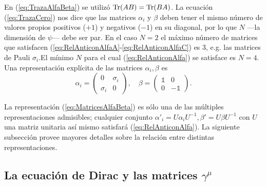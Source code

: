 En (\ref{eq:TrazaAlfaBeta}) se utilizó $\operatorname{Tr}(AB)=\operatorname{Tr}(BA)$. La ecuación (\ref{eq:TrazaCero}) nos dice que las matrices $\alpha_i$ y $\beta$ deben tener el mismo número de valores propios positivos ($+1$) y negativos ($-1$) en su diagonal, por lo que $N$ ---la dimensión de $\psi$--- debe ser par. En el caso $N=2$ el máximo número de matrices que satisfacen (\ref{eq:RelAnticonAlfaA}-\ref{eq:RelAnticonAlfaC}) es 3, e.g. las matrices de Pauli $\sigma_i$.\footnotemark El mínimo $N$ para el cual (\ref{eq:RelAnticonAlfa}) se satisface es $N=4$. Una representación explícita de las matrices $\alpha_i, \beta$ es
\begin{equation}\label{eq:MatricesAlfaBeta}
     \alpha_i=\begin{pmatrix}
		0 & \sigma_i \\
		  \sigma_i & 0
	      \end{pmatrix},\quad
     \beta=\begin{pmatrix}
                \mathbb{1} & 0 \\
                0 & -\mathbb{1}
           \end{pmatrix}.
\end{equation}


La representación (\ref{eq:MatricesAlfaBeta}) es sólo una de las múltiples representaciones admisibles; cualquier conjunto ${\alpha'}_i=U\alpha_i U^{-1}, \beta'=U\beta U^{-1}$ con $U$ una matriz unitaria así mismo satisfará (\ref{eq:RelAnticonAlfa}). La siguiente subsección provee mayores detalles sobre la relación entre distintas representaciones.

\subsection{La ecuación de Dirac y las matrices \texorpdfstring{$\gamma^\mu$}{gamma}}
\label{subsec:MatricesGamma}

